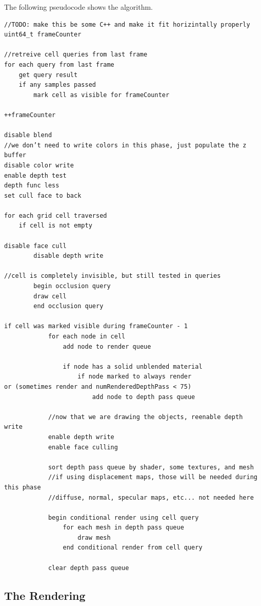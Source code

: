 \documentclass[12pt]{ucthesis}
\begin{document}
The following pseudocode shows the algorithm.

\begin{lstlisting}
//TODO: make this be some C++ and make it fit horizintally properly
uint64_t frameCounter

//retreive cell queries from last frame
for each query from last frame
	get query result
	if any samples passed
		mark cell as visible for frameCounter

++frameCounter

disable blend
//we don’t need to write colors in this phase, just populate the z buffer
disable color write
enable depth test
depth func less
set cull face to back
						
for each grid cell traversed
	if cell is not empty

disable face cull
		disable depth write
		
//cell is completely invisible, but still tested in queries			
		begin occlusion query
		draw cell
		end occlusion query			
	
if cell was marked visible during frameCounter - 1				
			for each node in cell
				add node to render queue

				if node has a solid unblended material
					if node marked to always render 
or (sometimes render and numRenderedDepthPass < 75)
						add node to depth pass queue
	
			//now that we are drawing the objects, reenable depth write
			enable depth write
			enable face culling
			
			sort depth pass queue by shader, some textures, and mesh
			//if using displacement maps, those will be needed during this phase
			//diffuse, normal, specular maps, etc... not needed here

			begin conditional render using cell query			
				for each mesh in depth pass queue
					draw mesh				
				end conditional render from cell query

			clear depth pass queue
\end{lstlisting}


\subsection {The Rendering}
\label{the-rendering}
\end{document}
